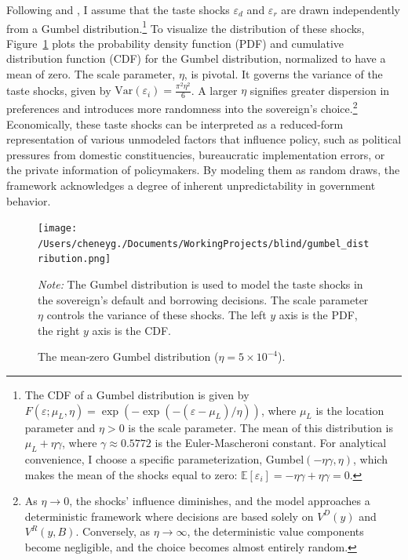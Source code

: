 \documentclass[12pt]{article}
\theoremstyle{plain}
\begin{document}
Following \citep{DvorkinSancheSaprizaYurdagul2021} and
\citep{MIHALACHEOREEF2024}, I assume that the taste shocks $\varepsilon_d$ and
$\varepsilon_r$ are drawn independently from a Gumbel
distribution.\footnote{The CDF of a Gumbel distribution is given by
	$F(\varepsilon; \mu_L, \eta) = \exp(-\exp(-(\varepsilon-\mu_L)/\eta))$, where
	$\mu_L$ is the location parameter and $\eta > 0$ is the scale parameter. The
	mean of this distribution is $\mu_L + \eta\gamma$, where $\gamma \approx
		0.5772$ is the Euler-Mascheroni constant. For analytical convenience, I choose
	a specific parameterization, Gumbel$(-\eta\gamma, \eta)$, which makes the mean
	of the shocks equal to zero: $\mathbb{E}[\varepsilon_i] = -\eta\gamma +
		\eta\gamma = 0$.} To visualize the distribution of these shocks,
Figure~\ref{fig:gumbel_dist} plots the probability density function (PDF) and
cumulative distribution function (CDF) for the Gumbel distribution, normalized
to have a mean of zero. The scale parameter, $\eta$, is pivotal. It governs the
variance of the taste shocks, given by $\text{Var}(\varepsilon_i) = \frac{\pi^2
		\eta^2}{6}$. A larger $\eta$ signifies greater dispersion in preferences and
introduces more randomness into the sovereign's choice.\footnote{As $\eta \to
		0$, the shocks' influence diminishes, and the model approaches a deterministic
	framework where decisions are based solely on $V^D(y)$ and $V^R(y,B)$.
	Conversely, as $\eta \to \infty$, the deterministic value components become
	negligible, and the choice becomes almost entirely random.} Economically, these
taste shocks can be interpreted as a reduced-form representation of various
unmodeled factors that influence policy, such as political pressures from
domestic constituencies, bureaucratic implementation errors, or the private
information of policymakers. By modeling them as random draws, the framework
acknowledges a degree of inherent unpredictability in government behavior.
\begin{figure}[htbp]
	\centering
	\texttt{[image: /Users/cheneyg./Documents/WorkingProjects/blind/gumbel\_distribution.png]}
	\caption{The mean-zero Gumbel distribution ($\eta=5\times 10^{-4}$).}
	\label{fig:gumbel_dist}
	\parbox{\linewidth}{\small\textit{Note:} The Gumbel distribution is used to model the taste shocks in the sovereign's default and borrowing decisions. The scale parameter $\eta$ controls the variance of these shocks. The left $y$ axis is the PDF, the right $y$ axis is the CDF.}
\end{figure}
\end{document}
